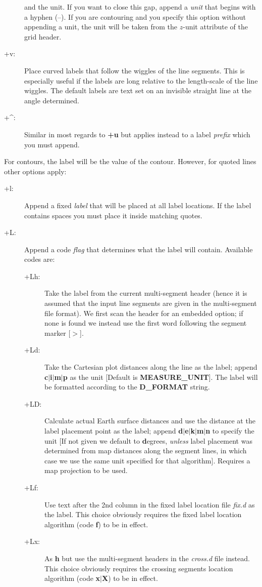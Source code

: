 \begin{description}
and the unit.  If you want to close this gap, append a {\it unit} that begins with a hyphen (--).
If you are contouring and you specify this option without appending a unit, the unit will be taken from the
$z$-unit attribute of the grid header.
\item [+v:]  Place curved labels that follow the wiggles of the line segments.  This is especially
useful if the labels are long relative to the length-scale of the line wiggles.  The default labels
are text set on an invisible straight line at the angle determined.
\item [+^:]  Similar in most regards to {\bf +u} but applies instead to a label \emph{prefix} which
you must append.
\end{description}
For contours, the label will be the value of the contour.  However, for quoted lines other
options apply:
\begin{description}
\item [+l:] Append a fixed {\it label} that will be placed at all label locations.  If the label contains
spaces you must place it inside matching quotes.
\item [+L:] Append a code {\it flag} that determines what the label will contain.  Available codes are:
\begin{description}
\item [+Lh:]  Take the label from the current multi-segment header (hence it is assumed that the
input line segments are given in the multi-segment file format).  We first scan the header for an embedded
 option; if none is found we instead use the first word following the segment marker [$>$].
\item [+Ld:] Take the Cartesian plot distances along the line as the label; append {\bf c$|$i$|$m$|$p}
as the unit [Default is {\bf MEASURE\_UNIT}].  The label will be formatted according to the {\bf D\_FORMAT}
string.
\item [+LD:]  Calculate actual Earth surface distances and use the distance at the label placement point as
the label; append {\bf d$|$e$|$k$|$m$|$n} to specify the unit [If not given we default to {\bf d}egrees,
\emph{unless} label placement was determined from map distances along the segment lines, in which case we
use the same unit specified for that algorithm].  Requires a map projection to be used.
\item [+Lf:]  Use text after the 2nd column in the fixed label location file {\it fix.d} as the label.
This choice obviously requires the fixed label location algorithm (code {\bf f}) to be in effect.
\item [+Lx:]  As {\bf h} but use the multi-segment headers in the {\it cross.d} file instead.
This choice obviously requires the crossing segments location algorithm (code {\bf x$|$X}) to be in effect.
\end{description}
\end{description}


